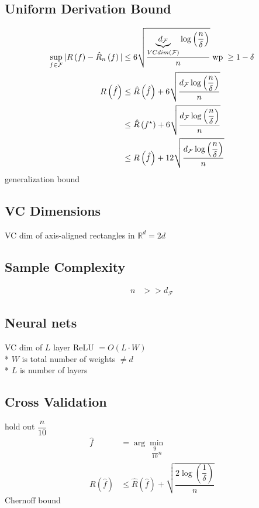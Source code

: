\documentclass{article}
\begin{document}
\subsection{Uniform Derivation Bound}
\begin{align*}
\displaystyle\sup_{f \in \mathcal{F}} | R\left(f\right) - \hat{R}_{n} \left(f\right) | &\leq  6 \sqrt{\dfrac{\underbrace{d_{\mathcal{F}}}_{VC dim\left(\mathcal{F}\right)} \log\left(\dfrac{n}{\delta}\right)}{n}} \text{\;wp\;} \geq  1 - \delta
\\ R\left(\hat{f}\right)  &\leq  \hat{R}\left(\hat{f}\right) + 6 \sqrt{\dfrac{d_{\mathcal{F}} \log\left(\dfrac{n}{\delta}\right)}{n}}
\\ &\leq  \hat{R}\left(f^\star \right) + 6 \sqrt{\dfrac{d_{\mathcal{F}} \log\left(\dfrac{n}{\delta}\right)}{n}}
\\ &\leq  R\left(\hat{f}\right) + 12 \sqrt{\dfrac{d_{\mathcal{F}} \log\left(\dfrac{n}{\delta}\right)}{n}}
\end{align*}
generalization bound



\subsection{VC Dimensions}
VC dim of axis-aligned rectangles in $\mathbb{R}^{d} = 2 d $



\subsection{Sample Complexity}
\begin{align*}
n  &>> d_{\mathcal{F}}
\end{align*}


\subsection{Neural nets}
VC dim of $L $ layer ReLU $= O\left(L \cdot  W\right) $
\\* $W $ is total number of weights $\neq  d $
\\* $L $ is number of layers



\subsection{Cross Validation}
hold out $\dfrac{n}{10}$
\begin{align*}
\hat{f} &= \arg\displaystyle\min_{\dfrac{9}{10} n}
\\ R\left(\hat{f}\right)  &\leq  \hat{R}\left(\hat{f}\right) + \sqrt{\dfrac{2 \log\left(\dfrac{1}{\delta}\right)}{n}}
\end{align*}
Chernoff bound
\end{document}
